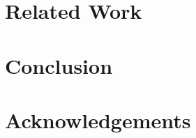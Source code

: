\section{Related Work}
\label{sec:related}

\section{Conclusion}
\label{sec:conclu}

\section{Acknowledgements}